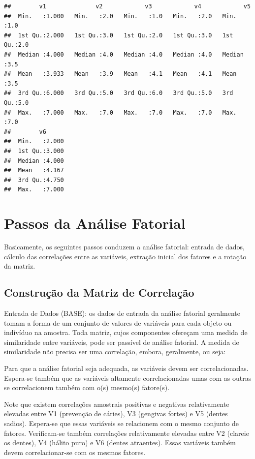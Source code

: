 \documentclass[12pt,brazil,]{book}
\begin{document}
\begin{verbatim}
##        v1              v2            v3            v4            v5     
##  Min.   :1.000   Min.   :2.0   Min.   :1.0   Min.   :2.0   Min.   :1.0  
##  1st Qu.:2.000   1st Qu.:3.0   1st Qu.:2.0   1st Qu.:3.0   1st Qu.:2.0  
##  Median :4.000   Median :4.0   Median :4.0   Median :4.0   Median :3.5  
##  Mean   :3.933   Mean   :3.9   Mean   :4.1   Mean   :4.1   Mean   :3.5  
##  3rd Qu.:6.000   3rd Qu.:5.0   3rd Qu.:6.0   3rd Qu.:5.0   3rd Qu.:5.0  
##  Max.   :7.000   Max.   :7.0   Max.   :7.0   Max.   :7.0   Max.   :7.0  
##        v6       
##  Min.   :2.000  
##  1st Qu.:3.000  
##  Median :4.000  
##  Mean   :4.167  
##  3rd Qu.:4.750  
##  Max.   :7.000
\end{verbatim}

\hypertarget{passos-da-analise-fatorial}{%
\section{Passos da Análise Fatorial}\label{passos-da-analise-fatorial}}

Basicamente, os seguintes passos conduzem a análise fatorial: entrada de
dados, cálculo das correlações entre as variáveis, extração inicial dos
fatores e a rotação da matriz.

\hypertarget{construcao-da-matriz-de-correlacao}{%
\subsection{Construção da Matriz de
Correlação}\label{construcao-da-matriz-de-correlacao}}

Entrada de Dados (BASE): os dados de entrada da análise fatorial
geralmente tomam a forma de um conjunto de valores de variáveis para
cada objeto ou indivíduo na amostra. Toda matriz, cujos componentes
ofereçam uma medida de similaridade entre variáveis, pode ser passível
de análise fatorial. A medida de similaridade não precisa ser uma
correlação, embora, geralmente, ou seja:

Para que a análise fatorial seja adequada, as variáveis devem ser
correlacionadas. Espera-se também que as variáveis altamente
correlacionadas umas com as outras se correlacionem também com o(s)
mesmo(s) fatore(s).

Note que existem correlações amostrais positivas e negativas
relativamente elevadas entre V1 (prevenção de cáries), V3 (gengivas
fortes) e V5 (dentes sadios). Espera-se que essas variáveis se
relacionem com o mesmo conjunto de fatores. Verificam-se também
correlações relativamente elevadas entre V2 (clareie os dentes), V4
(hálito puro) e V6 (dentes atraentes). Essas variáveis também devem
correlacionar-se com os mesmos fatores.
\end{document}
